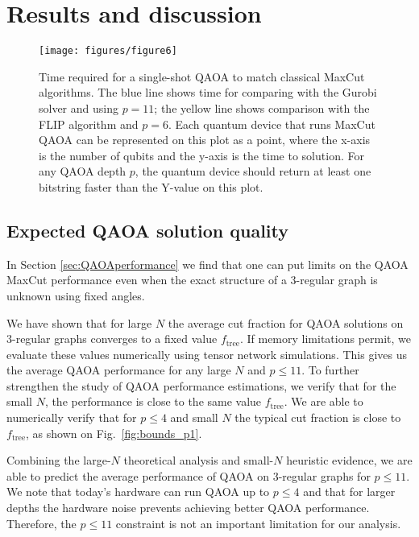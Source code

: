 \section{Results and discussion}
\label{sec:results}


\begin{figure}
    \centering
    \texttt{[image: figures/figure6]}
    \caption{
    Time required for a single-shot QAOA to match classical MaxCut algorithms.
    The blue line shows time for comparing with the Gurobi solver and using $p=11$;  the yellow line shows comparison with the FLIP algorithm and $p=6$.
    Each quantum device that runs MaxCut QAOA can be represented on this plot as a point, where the x-axis is the number of qubits and the y-axis is the time to solution. 
    For any QAOA depth $p$, the quantum device should return at least one bitstring faster than the Y-value on this plot.
    }
    \label{fig:adv_freq}
\end{figure}

\subsection{Expected QAOA solution quality}
 In Section \ref{sec:QAOAperformance} we find that one can put limits on the QAOA MaxCut performance even when the exact structure of a 3-regular graph is unknown using fixed angles.

We have shown that for large $N$ the average cut fraction for QAOA solutions on 3-regular graphs converges to a fixed value $f_{\text {tree}}$. If memory limitations permit, we evaluate these values numerically using tensor network simulations. This gives us the average QAOA performance for any large $N$ and $p\leq11$.  To further strengthen the study of QAOA performance estimations, we verify that for the small $N$, the performance is close to the same value $f_{\text{tree}}$. We are able to numerically verify that for $p\leq 4$ and small $N$ the typical cut fraction is close to $f_{\text {tree}}$, as shown on Fig.~\ref{fig:bounds_p1}.

Combining the large-$N$ theoretical analysis and small-$N$ heuristic evidence, we are able to predict the average performance of QAOA on 3-regular graphs for $p\leq11$. We note that today's hardware can run QAOA up to $p\leq4$ \cite{ebadi2022} and that for larger depths the hardware noise prevents achieving better QAOA performance. Therefore, the $p\leq11$ constraint is not an important limitation for our analysis.

